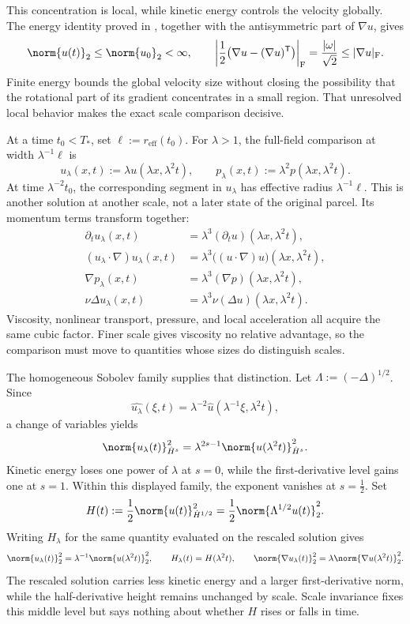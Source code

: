 This concentration is local, while kinetic energy controls the velocity globally. The energy identity proved in , together with the antisymmetric part of \(\nabla u\), gives
\[
  \norm{u(t)}_2
  \leq
  \norm{u_0}_2
  <\infty,
  \qquad
  \left|\frac12\bigl(\nabla u-(\nabla u)^{\mathsf T}\bigr)\right|_{\mathrm F}
  =
  \frac{|\omega|}{\sqrt2}
  \leq
  |\nabla u|_{\mathrm F}.
\]
Finite energy bounds the global velocity size without closing the possibility that the rotational part of its gradient concentrates in a small region. That unresolved local behavior makes the exact scale comparison decisive.


At a time \(t_0<T_*\), set \(\ell:=r_{\mathrm{eff}}(t_0)\). For \(\lambda>1\), the full-field comparison at width \(\lambda^{-1}\ell\) is
\[
  u_\lambda(x,t)
  :=
  \lambda u(\lambda x,\lambda^2t),
  \qquad
  p_\lambda(x,t)
  :=
  \lambda^2p(\lambda x,\lambda^2t).
\]
At time \(\lambda^{-2}t_0\), the corresponding segment in \(u_\lambda\) has effective radius \(\lambda^{-1}\ell\). This is another solution at another scale, not a later state of the original parcel. Its momentum terms transform together:
\[
\begin{aligned}
  \partial_tu_\lambda(x,t)
  &=
  \lambda^3(\partial_tu)(\lambda x,\lambda^2t),
  \\
  (u_\lambda\cdot\nabla)u_\lambda(x,t)
  &=
  \lambda^3\bigl((u\cdot\nabla)u\bigr)(\lambda x,\lambda^2t),
  \\
  \nabla p_\lambda(x,t)
  &=
  \lambda^3(\nabla p)(\lambda x,\lambda^2t),
  \\
  \nu\Delta u_\lambda(x,t)
  &=
  \lambda^3\nu(\Delta u)(\lambda x,\lambda^2t).
\end{aligned}
\]
Viscosity, nonlinear transport, pressure, and local acceleration all acquire the same cubic factor. Finer scale gives viscosity no relative advantage, so the comparison must move to quantities whose sizes do distinguish scales.


The homogeneous Sobolev family supplies that distinction. Let \(\Lambda:=(-\Delta)^{1/2}\). Since
\[
  \widehat{u_\lambda}(\xi,t)
  =
  \lambda^{-2}\widehat u(\lambda^{-1}\xi,\lambda^2t),
\]
a change of variables yields
\[
  \norm{u_\lambda(t)}_{\dot H^s}^2
  =
  \lambda^{2s-1}
  \norm{u(\lambda^2t)}_{\dot H^s}^2.
\]
Kinetic energy loses one power of \(\lambda\) at \(s=0\), while the first-derivative level gains one at \(s=1\). Within this displayed family, the exponent vanishes at \(s=\tfrac12\). Set
\[
  H(t)
  :=
  \frac12\norm{u(t)}_{\dot H^{1/2}}^2
  =
  \frac12\norm{\Lambda^{1/2}u(t)}_2^2.
\]
Writing \(H_\lambda\) for the same quantity evaluated on the rescaled solution gives
\[
  \norm{u_\lambda(t)}_2^2
  =
  \lambda^{-1}\norm{u(\lambda^2t)}_2^2,
  \qquad
  H_\lambda(t)=H(\lambda^2t),
  \qquad
  \norm{\nabla u_\lambda(t)}_2^2
  =
  \lambda\norm{\nabla u(\lambda^2t)}_2^2.
\]
The rescaled solution carries less kinetic energy and a larger first-derivative norm, while the half-derivative height remains unchanged by scale. Scale invariance fixes this middle level but says nothing about whether \(H\) rises or falls in time.


